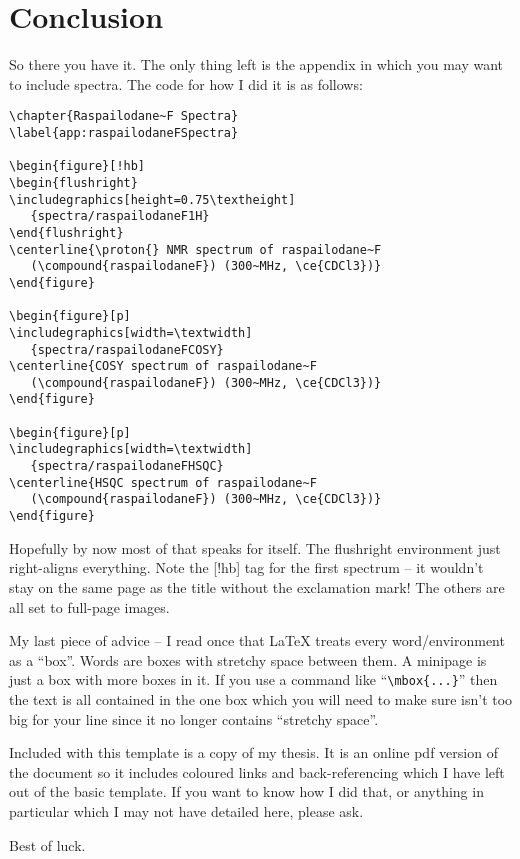 
\chapter{Conclusion}
\label{ch:conclusion}

So there you have it.  The only thing left is the appendix in which you may want to include spectra.  The code for how I did it is as follows:

\small\singlespacing
\begin{verbatim}
\chapter{Raspailodane~F Spectra}
\label{app:raspailodaneFSpectra}

\begin{figure}[!hb]
\begin{flushright}
\includegraphics[height=0.75\textheight]
   {spectra/raspailodaneF1H}
\end{flushright}
\centerline{\proton{} NMR spectrum of raspailodane~F
   (\compound{raspailodaneF}) (300~MHz, \ce{CDCl3})}
\end{figure}

\begin{figure}[p]
\includegraphics[width=\textwidth]
   {spectra/raspailodaneFCOSY}
\centerline{COSY spectrum of raspailodane~F
   (\compound{raspailodaneF}) (300~MHz, \ce{CDCl3})}
\end{figure}

\begin{figure}[p]
\includegraphics[width=\textwidth]
   {spectra/raspailodaneFHSQC}
\centerline{HSQC spectrum of raspailodane~F
   (\compound{raspailodaneF}) (300~MHz, \ce{CDCl3})}
\end{figure}
\end{verbatim}

\normalsize\doublespacing
Hopefully by now most of that speaks for itself.  The flushright environment just right-aligns everything.  Note the [!hb] tag for the first spectrum -- it wouldn't stay on the same page as the title without the exclamation mark!  The others are all set to full-page images.

My last piece of advice -- I read once that \LaTeX{} treats every word/environment as a ``box''.  Words are boxes with stretchy space between them.  A minipage is just a box with more boxes in it.  If you use a command like ``\small\verb$\mbox{...}$\normalsize'' then the text is all contained in the one box which you will need to make sure isn't too big for your line since it no longer contains ``stretchy space''.

Included with this template is a copy of my thesis.  It is an online pdf version of the document so it includes coloured links and back-referencing which I have left out of the basic template.  If you want to know how I did that, or anything in particular which I may not have detailed here, please ask.

Best of luck.